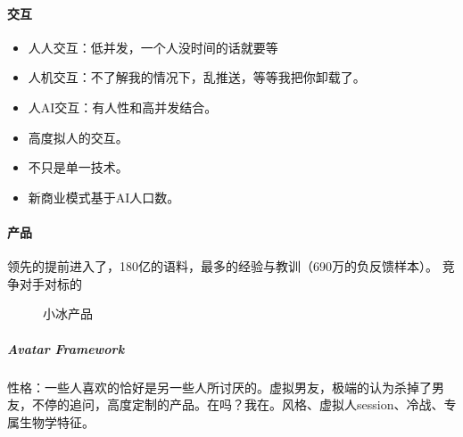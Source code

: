 \documentclass[letterpaper,10pt,english]{sphinxmanual}
\begin{document}
\paragraph{交互}
\label{\detokenize{chapter_AI_company/xiaoice:id12}}\begin{itemize}
\item {} 
人人交互：低并发，一个人没时间的话就要等

\item {} 
人机交互：不了解我的情况下，乱推送，等等我把你卸载了。

\item {} 
人AI交互：有人性和高并发结合。

\item {} 
高度拟人的交互。

\item {} 
不只是单一技术。

\item {} 
新商业模式基于AI人口数。%
\begin{footnote}[1063]\sphinxAtStartFootnote
{}
%
\end{footnote}

\end{itemize}


\paragraph{产品}
\label{\detokenize{chapter_AI_company/xiaoice:id13}}
领先的提前进入了，180亿的语料，最多的经验与教训（690万的负反馈样本）。
竞争对手对标的

\begin{figure}[H]
\centering
\capstart

\noindent{}
\caption{小冰产品}\label{\detokenize{chapter_AI_company/xiaoice:id26}}\end{figure}

\begin{center}\end{center} 


\subparagraph{Avatar Framework}
\label{\detokenize{chapter_AI_company/xiaoice:avatar-framework}}
性格：一些人喜欢的恰好是另一些人所讨厌的。虚拟男友，极端的认为杀掉了男友，不停的追问，高度定制的产品。在吗？我在。风格、虚拟人session、冷战、专属生物学特征。
\end{document}
